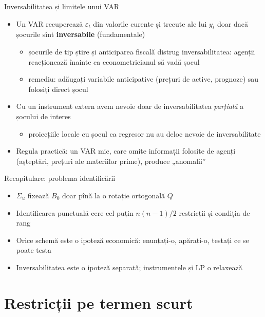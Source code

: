\begin{frame}{Inversabilitatea și limitele unui VAR}
\itemsize{\small}
\begin{itemize}
    \item Un VAR recuperează $\varepsilon_t$ din valorile curente și trecute ale lui $y_t$ doar dacă șocurile sînt \textbf{inversabile} (fundamentale)
    \begin{itemize}
        \item șocurile de tip știre și anticiparea fiscală distrug inversabilitatea: agenții reacționează înainte ca econometricianul să vadă șocul
        \item remediu: adăugați variabile anticipative (prețuri de active, prognoze) sau folosiți direct șocul 
    \end{itemize}
    \item Cu un instrument extern avem nevoie doar de inversabilitatea \emph{parțială} a șocului de interes 
    \begin{itemize}
        \item proiecțiile locale cu șocul ca regresor nu au deloc nevoie de inversabilitate 
    \end{itemize}
    \item Regula practică: un VAR mic, care omite informații folosite de agenți (așteptări, prețuri ale materiilor prime), produce „anomalii”
\end{itemize}
\end{frame}

\begin{frame}{Recapitulare: problema identificării}
\itemsize{\small}
\begin{itemize}
    \item $\Sigma_u$ fixează $B_0$ doar pînă la o rotație ortogonală $Q$
    \item Identificarea punctuală cere cel puțin $n(n - 1)/2$ restricții și condiția de rang
    \item Orice schemă este o ipoteză economică: enunțați-o, apărați-o, testați ce se poate testa
    \item Inversabilitatea este o ipoteză separată; instrumentele și LP o relaxează
\end{itemize}
\end{frame}


\section{Restricții pe termen scurt}

